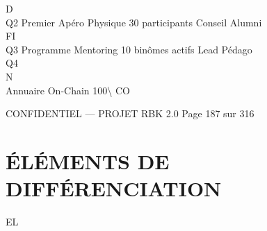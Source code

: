 \vspace{0.5em}
D\\
Q2        Premier Apéro Physique 30 participants     Conseil Alumni\\
\vspace{0.5em}
\vspace{0.5em}
\vspace{0.5em}
\vspace{0.5em}
FI\\
Q3        Programme Mentoring 10 binômes actifs      Lead Pédago\\
Q4\\
N\\
Annuaire On-Chain      100\textbackslash{}%
CO\\
\vspace{0.5em}
\vspace{0.5em}
\vspace{0.5em}
\vspace{0.5em}
\begin{confidential}CONFIDENTIEL — PROJET RBK 2.0                              Page 187 sur 316\end{confidential}
\section{ÉLÉMENTS DE DIFFÉRENCIATION}
\vspace{0.5em}
\vspace{0.5em}
\vspace{0.5em}
\vspace{0.5em}
EL\\
